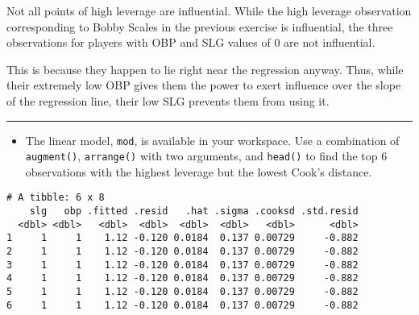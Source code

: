 \documentclass[
]{book}
\newenvironment{Shaded}{\begin{snugshade}}{\end{snugshade}}
\newcommand{\CommentTok}[1]{\textcolor[rgb]{0.56,0.35,0.01}{\textit{#1}}}
\newcommand{\KeywordTok}[1]{\textcolor[rgb]{0.13,0.29,0.53}{\textbf{#1}}}
\newcommand{\NormalTok}[1]{#1}
\newcommand{\OperatorTok}[1]{\textcolor[rgb]{0.81,0.36,0.00}{\textbf{#1}}}
\newcommand{\StringTok}[1]{\textcolor[rgb]{0.31,0.60,0.02}{#1}}
\providecommand{\tightlist}{%
  \setlength{\itemsep}{0pt}\setlength{\parskip}{0pt}}
\begin{document}
Not all points of high leverage are influential. While the high leverage observation corresponding to Bobby Scales in the previous exercise is influential, the three observations for players with OBP and SLG values of 0 are not influential.

This is because they happen to lie right near the regression anyway. Thus, while their extremely low OBP gives them the power to exert influence over the slope of the regression line, their low SLG prevents them from using it.

\begin{center}\rule{0.5\linewidth}{0.5pt}\end{center}

\begin{itemize}
\tightlist
\item
  The linear model, \texttt{mod}, is available in your workspace. Use a combination of \texttt{augment()}, \texttt{arrange()} with two arguments, and \texttt{head()} to find the top 6 observations with the highest leverage but the lowest Cook's distance.
\end{itemize}

\begin{Shaded}
\end{Shaded}

\begin{verbatim}
# A tibble: 6 x 8
    slg   obp .fitted .resid   .hat .sigma .cooksd .std.resid
  <dbl> <dbl>   <dbl>  <dbl>  <dbl>  <dbl>   <dbl>      <dbl>
1     1     1    1.12 -0.120 0.0184  0.137 0.00729     -0.882
2     1     1    1.12 -0.120 0.0184  0.137 0.00729     -0.882
3     1     1    1.12 -0.120 0.0184  0.137 0.00729     -0.882
4     1     1    1.12 -0.120 0.0184  0.137 0.00729     -0.882
5     1     1    1.12 -0.120 0.0184  0.137 0.00729     -0.882
6     1     1    1.12 -0.120 0.0184  0.137 0.00729     -0.882
\end{verbatim}

  
\end{document}
